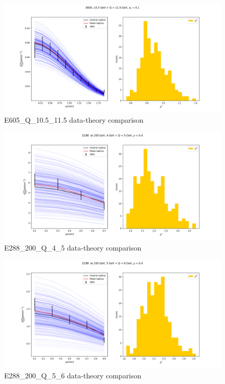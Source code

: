 \documentclass[
]{article}
\begin{document}
\begin{figure}
\centering
\includegraphics{pngplots/E605_Q_10.5_11.5.png}
\caption{E605\_Q\_10.5\_11.5 data-theory comparison}
\end{figure}

\begin{figure}
\centering
\includegraphics{pngplots/E288_200_Q_4_5.png}
\caption{E288\_200\_Q\_4\_5 data-theory comparison}
\end{figure}

\begin{figure}
\centering
\includegraphics{pngplots/E288_200_Q_5_6.png}
\caption{E288\_200\_Q\_5\_6 data-theory comparison}
\end{figure}
\end{document}

